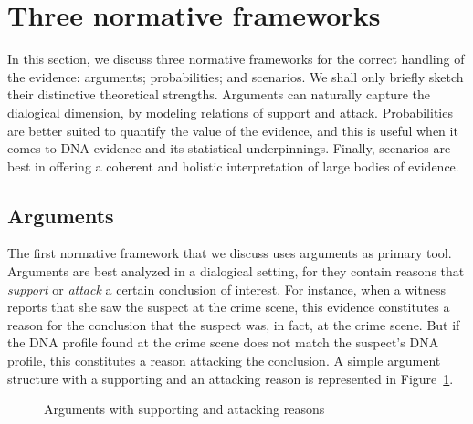 \documentclass[10pt]{article}
\begin{document}
\section{Three normative frameworks}
\label{sec:frameworks}

In this section, we discuss three normative frameworks for the correct handling of the evidence: 
arguments; probabilities; and scenarios. %
We shall only briefly sketch their distinctive theoretical strengths. Arguments can naturally 
capture the dialogical dimension, by modeling relations of support and attack. 
Probabilities are better suited to quantify the value of the evidence, and this 
is useful when it comes to DNA evidence and its statistical underpinnings. Finally, scenarios are 
best in offering a coherent and holistic interpretation 
of large bodies of evidence. 


\subsection{Arguments}

The first normative framework %
that we discuss uses arguments as primary tool. 
Arguments are best analyzed in a dialogical setting, for they 
contain reasons that \textit{support} or \textit{attack} a certain conclusion of interest. For instance, when a witness reports that 
she saw the suspect at the crime scene, this evidence constitutes a reason for the conclusion that 
the suspect was, in fact, at the crime scene. But if the DNA profile found at the crime scene 
does not match the suspect's DNA profile, this constitutes 
a reason attacking the conclusion. A simple argument structure with a supporting and 
an attacking reason is represented in Figure~\ref{fig:arg}.

\begin{figure}[bt]
\centering

\caption{Arguments with supporting and attacking reasons\label{fig:arg}}
\end{figure}

\end{document}
